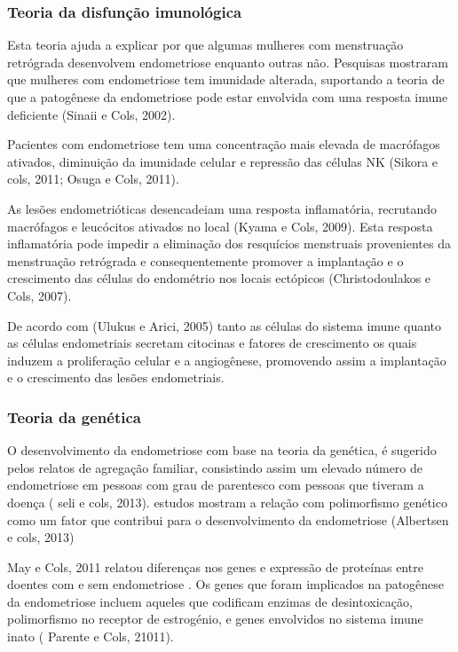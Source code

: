 \documentclass[12pt]{article} %
\begin{document}
\subsubsection{Teoria da disfunção imunológica}

Esta teoria ajuda a explicar por que algumas mulheres com menstruação
retrógrada desenvolvem endometriose enquanto outras não. Pesquisas
mostraram que mulheres com endometriose tem imunidade alterada,
suportando a teoria de que a patogênese da endometriose pode estar
envolvida com uma resposta imune deficiente (Sinaii e Cols, 2002).

Pacientes com endometriose tem uma concentração mais elevada de
macrófagos ativados, diminuição da imunidade celular e repressão das
células NK (Sikora e cols, 2011; Osuga e Cols, 2011).

As lesões endometrióticas desencadeiam uma resposta inflamatória,
recrutando macrófagos e leucócitos ativados no local (Kyama e Cols,
2009). Esta resposta inflamatória pode impedir a eliminação dos
resquícios menstruais provenientes da menstruação retrógrada e
consequentemente promover a implantação e o crescimento das células do
endométrio nos locais ectópicos (Christodoulakos e Cols, 2007).

De acordo com (Ulukus e Arici, 2005) tanto as células do sistema imune
quanto as células endometriais secretam citocinas e fatores de
crescimento os quais induzem a proliferação celular e a angiogênese,
promovendo assim a implantação e o crescimento das lesões
endometriais.


\subsubsection{ Teoria da genética}

O desenvolvimento da endometriose com base na teoria da genética, é sugerido pelos relatos de agregação familiar, consistindo assim um elevado número de endometriose em pessoas com grau de parentesco com pessoas que tiveram a doença ( seli e cols, 2013).
estudos mostram a relação com polimorfismo genético como um fator que contribui para o desenvolvimento da endometriose (Albertsen e cols, 2013)

May e Cols, 2011 relatou  diferenças nos genes e expressão de proteínas entre doentes com e sem endometriose . Os genes que foram implicados na patogênese da endometriose incluem aqueles que codificam enzimas de desintoxicação, polimorfismo no receptor de estrogénio, e genes envolvidos no sistema imune inato ( Parente e Cols, 21011). 
\end{document}
